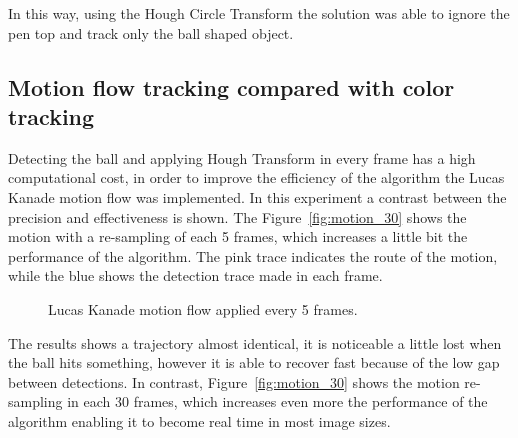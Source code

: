 \documentclass[10pt,twocolumn,letterpaper]{article}
\begin{document}
In this way,  using the Hough Circle Transform the solution was able to ignore the pen top and track only the ball shaped object. 

\subsection{Motion flow tracking compared with color tracking}

Detecting the ball and applying Hough Transform in every frame has a high computational cost, in order to improve the efficiency of the algorithm the Lucas Kanade motion flow was implemented. In this experiment a contrast between the precision and effectiveness is shown. The Figure~\ref{fig:motion_30} shows the motion with a re-sampling of each 5 frames, which increases a little bit the performance of the algorithm. The pink trace indicates the route of the motion, while the blue shows the detection trace made in each frame.

\begin{figure}[!h]
	\centering
	\setlength{\fboxsep}{1pt}
	\setlength{\fboxrule}{1pt}
	\caption{Lucas Kanade motion flow applied every 5 frames.}\label{fig:motion_5}
\end{figure}

The results shows a trajectory almost identical, it is noticeable a little lost when the ball hits something, however it is able to recover fast because of the low gap between detections. In contrast, Figure~\ref{fig:motion_30} shows the motion re-sampling in each 30 frames, which increases even more the performance of the algorithm enabling it to become real time in most image sizes.
\end{document}
